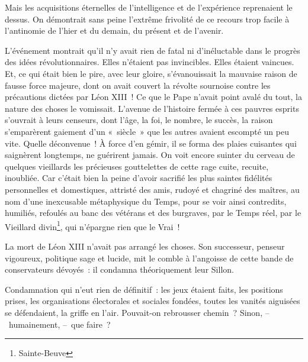 \documentclass[french,twoside]{book} %
\begin{document}
Mais les acquisitions éternelles de l’intelligence et de l’expérience reprenaient le dessus. On démontrait sans peine l’extrême frivolité de ce recours trop facile à l’antinomie de l’hier et du demain, du présent et de l’avenir.\par
L’événement montrait qu’il n’y avait rien de fatal ni d’inéluctable dans le progrès des idées révolutionnaires. Elles n’étaient pas invincibles. Elles étaient vaincues. Et, ce qui était bien le pire, avec leur gloire, s’évanouissait la mauvaise raison de fausse force majeure, dont on avait couvert la révolte sournoise contre les précautions dictées par Léon XIII ! Ce que le Pape n’avait point avalé du tout, la nature des choses le vomissait. L’avenue de l’histoire fermée à ces pauvres esprits s’ouvrait à leurs censeurs, dont l’âge, la foi, le nombre, le succès, la raison s’emparèrent gaiement d’un « siècle » que les autres avaient escompté un peu vite. Quelle déconvenue ! À force d’en gémir, il se forma des plaies cuisantes qui saignèrent longtemps, ne guérirent jamais. On voit encore suinter du cerveau de quelques vieillards les précieuses gouttelettes de cette rage cuite, recuite, inoubliée. Car c’était bien la peine d’avoir sacrifié les plus saintes fidélités personnelles et domestiques, attristé des amis, rudoyé et chagriné des maîtres, au nom d’une inexcusable métaphysique du Temps, pour se voir ainsi contredits, humiliés, refoulés au banc des vétérans et des burgraves, par le Temps réel, par le Vieillard divin\footnote{Sainte-Beuve}, qui n’épargne rien que le Vrai !\par
La mort de Léon XIII n’avait pas arrangé les choses. Son successeur, penseur vigoureux, politique sage et lucide, mit le comble à l’angoisse de cette bande de conservateurs dévoyés : il condamna théoriquement leur Sillon.\par
Condamnation qui n’eut rien de définitif : les jeux étaient faits, les positions prises, les organisations électorales et sociales fondées, toutes les vanités aiguisées se défendaient, la griffe en l’air. Pouvait-on rebrousser chemin ? Sinon, – humainement, – que faire ?\par
\end{document}
